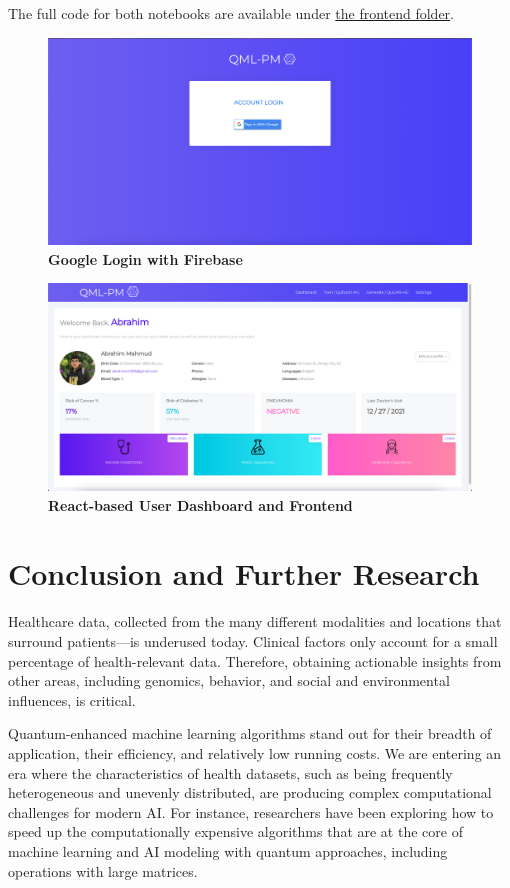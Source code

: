 \documentclass{scrartcl}
\begin{document}
The full code for both notebooks are available under \href{frontend/}{the frontend folder}.

\begin{figure}[htbp]
\centering
\includegraphics[width=.9\linewidth]{./assets/QML-PM_LOGIN.png}
\caption{\textbf{Google Login with Firebase}}
\end{figure}

\begin{figure}[htbp]
\centering
\includegraphics[width=.9\linewidth]{./assets/QML-PM_DASHBOARD.png}
\caption{\textbf{React-based User Dashboard and Frontend}}
\end{figure}

\section{Conclusion and Further Research}
\label{sec:org4693e97}

Healthcare data, collected from the many different modalities and locations that surround patients—is underused today. Clinical factors only account for a small percentage of health-relevant data. Therefore, obtaining actionable insights from other areas, including genomics, behavior, and social and environmental influences, is critical.

Quantum-enhanced machine learning algorithms stand out for their breadth of application, their efficiency, and relatively low running costs. We are entering an era where the characteristics of health datasets, such as being frequently heterogeneous and unevenly distributed, are producing complex computational challenges for modern AI. For instance, researchers have been exploring how to speed up the computationally expensive algorithms that are at the core of machine learning and AI modeling with quantum approaches, including operations with large matrices.
\end{document}
